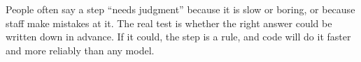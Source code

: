 \begin{watchout}
People often say a step ``needs judgment'' because it is slow or boring, or because staff make mistakes at it. The real test is whether the right answer could be written down in advance. If it could, the step is a rule, and code will do it faster and more reliably than any model.
\end{watchout}
